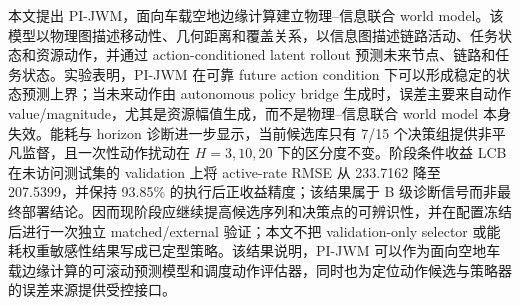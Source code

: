 \documentclass[letterpaper,journal]{IEEEtran}
\newcommand{\pjwm}{PI-JWM}
\begin{document}
本文提出 \pjwm{}，面向车载空地边缘计算建立物理--信息联合 world model。该模型以物理图描述移动性、几何距离和覆盖关系，以信息图描述链路活动、任务状态和资源动作，并通过 action-conditioned latent rollout 预测未来节点、链路和任务状态。实验表明，\pjwm{} 在可靠 future action condition 下可以形成稳定的状态预测上界；当未来动作由 autonomous policy bridge 生成时，误差主要来自动作 value/magnitude，尤其是资源幅值生成，而不是物理--信息联合 world model 本身失效。能耗与 horizon 诊断进一步显示，当前候选库只有 7/15 个决策组提供非平凡监督，且一次性动作扰动在 $H=3,10,20$ 下的区分度不变。阶段条件收益 LCB 在未访问测试集的 validation 上将 active-rate RMSE 从 233.7162 降至 207.5399，并保持 93.85\% 的执行后正收益精度；该结果属于 B 级诊断信号而非最终部署结论。因而现阶段应继续提高候选序列和决策点的可辨识性，并在配置冻结后进行一次独立 matched/external 验证；本文不把 validation-only selector 或能耗权重敏感性结果写成已定型策略。该结果说明，\pjwm{} 可以作为面向空地车载边缘计算的可滚动预测模型和调度动作评估器，同时也为定位动作候选与策略器的误差来源提供受控接口。
\sloppy
\end{document}

